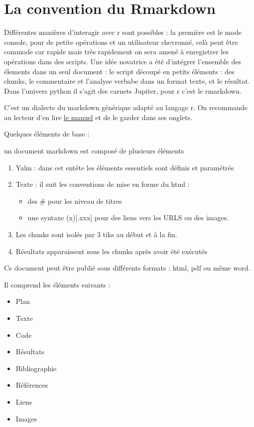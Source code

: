 \documentclass[
]{book}
\providecommand{\tightlist}{%
  \setlength{\itemsep}{0pt}\setlength{\parskip}{0pt}}
\begin{document}
\hypertarget{la-convention-du-rmarkdown}{%
\section{La convention du Rmarkdown}\label{la-convention-du-rmarkdown}}

Différentes manières d'interagir avec r sont possibles : la première est le mode console, pour de petite opérations et un utilisateur chevronné, celà peut être commode car rapide mais très rapidement on sera amené à enregistrer les opérations dans des scripts. Une idée novatrice a été d'intégrer l'ensemble des élements dans un seul document : le script découpé en petits éléments : des chunks, le commentaire et l'analyse verbabe dans un format texte, et le résultat. Dans l'univers python il s'agit des carnets Jupiter, pour r c'est le rmarkdown.

C'est un dialecte du markdown générique adapté au langage r. On recommande au lecteur d'en lire \href{https://bookdown.org/yihui/rmarkdown/}{le manuel} et de le garder dans ses onglets.

Quelques éléments de base :

un document markdown est composé de plusieurs éléments

\begin{enumerate}
\def\labelenumi{\arabic{enumi}.}
\tightlist
\item
  Yalm : dans cet entête les éléments essentiels sont définis et paramétrés
\item
  Texte : il suit les conventions de mise en forme du html :

  \begin{itemize}
  \tightlist
  \item
    des \# pour les niveau de titres
  \item
    une syntaxe (x){[}.xxx{]} pour des liens vers les URLS ou des images.
  \end{itemize}
\item
  Les chunks sont isolés par 3 tiks au début et à la fin.
\item
  Résultats apparaissent sous les chunks après avoir été exécutés
\end{enumerate}

Ce document peut être publié sous différents formats : html, pdf ou même word.

Il comprend les éléments suivants :

\begin{itemize}
\tightlist
\item
  Plan
\item
  Texte
\item
  Code
\item
  Résultats
\item
  Bibliographie
\item
  Références
\item
  Liens
\item
  Images
\end{itemize}
\end{document}
